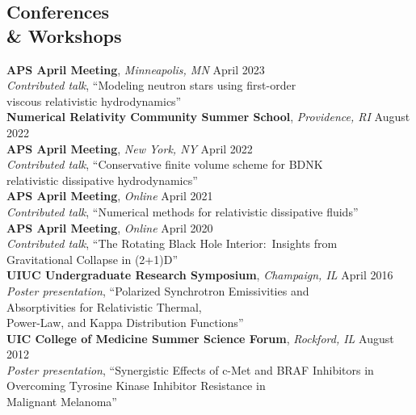 \documentclass[margin,line,11pt]{resume}
\edef\hc{\string:} %
\begin{document}
\begin{resume}
\vspace{2mm}
\section{\mysidestyle Conferences \\ \& Workshops}

\textbf{APS April Meeting}, \textit{Minneapolis, MN} \hfill April 2023\\
\textit{Contributed talk}, ``Modeling neutron stars using first-order \\
\hphantom{.}\hspace{30mm}viscous relativistic hydrodynamics'' \vspace{2mm} \\
\textbf{Numerical Relativity Community Summer School}, \textit{Providence, RI} \hfill August 2022\vspace{2mm}\\
\textbf{APS April Meeting}, \textit{New York, NY} \hfill April 2022\\
\textit{Contributed talk}, ``Conservative finite volume scheme for BDNK \\
\hphantom{.}\hspace{30mm}relativistic dissipative hydrodynamics'' \vspace{2mm} \\
\textbf{APS April Meeting}, \textit{Online} \hfill April 2021\\
\textit{Contributed talk}, ``Numerical methods for relativistic dissipative fluids'' \vspace{2mm} \\
\textbf{APS April Meeting}, \textit{Online} \hfill April 2020\\
\textit{Contributed talk}, ``The Rotating Black Hole Interior\hc\, Insights from \\
\hphantom{.}\hspace{28mm} Gravitational Collapse in (2+1)D'' \vspace{2mm} \\
\textbf{UIUC Undergraduate Research Symposium}, \textit{Champaign, IL} \hfill April 2016\\
\textit{Poster presentation}, ``Polarized Synchrotron Emissivities and \\
\hphantom{.}\hspace{34mm} Absorptivities for Relativistic Thermal, \\
\hphantom{.}\hspace{34mm} Power-Law, and Kappa Distribution Functions'' \vspace{2mm} \\
\textbf{UIC College of Medicine Summer Science Forum}, \textit{Rockford, IL} \hfill August 2012\\
\textit{Poster presentation}, ``Synergistic Effects of c-Met and BRAF Inhibitors in \\
\hphantom{.}\hspace{34mm} Overcoming Tyrosine Kinase Inhibitor Resistance in \\
\hphantom{.}\hspace{34mm} Malignant Melanoma''


\end{resume}
\end{document}
